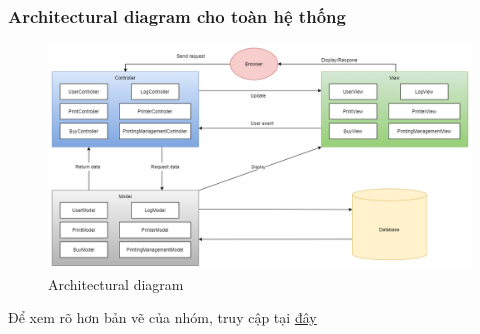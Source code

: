 \subsubsection{Architectural diagram cho toàn hệ thống}
\begin{figure}[H]
    \begin{center}
    \includegraphics[width=1\textwidth]{Images/Box-line + Deployment/Box-line.drawio.png}
\caption{Architectural diagram}
    \end{center}
\end{figure}
Để xem rõ hơn bản vẽ của nhóm, truy cập tại \href{https://drive.google.com/file/d/1FlW35PCz3uM8nGH6Ceg9soVdlz6sk9Pz/view?usp=sharing}{đây} 
